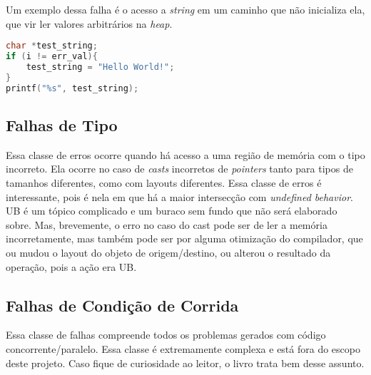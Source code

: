 Um exemplo dessa falha é o acesso a \emph{string} em um caminho que não inicializa ela, que vir ler valores arbitrários na \emph{heap}.

\begin{lstlisting}[language=C, label={lst:initialization}, caption=Exemplo de uma Falha de Inicalização com Strings]
char *test_string;
if (i != err_val){
	test_string = "Hello World!";
}
printf("%s", test_string);
\end{lstlisting}


\subsection{Falhas de Tipo}

Essa classe de erros ocorre quando há acesso a uma região de memória com o tipo incorreto. Ela ocorre no caso de \emph{casts} incorretos de \emph{pointers} tanto para tipos de tamanhos diferentes, como com layouts diferentes. Essa classe de erros é interessante, pois é nela em que há a maior intersecção com \emph{undefined behavior}. UB é um tópico complicado e um buraco sem fundo que não será elaborado sobre. Mas, brevemente, o erro no caso do cast pode ser de ler a memória incorretamente, mas também pode ser por alguma otimização do compilador, que ou mudou o layout do objeto de origem/destino, ou alterou o resultado da operação, pois a ação era UB.

\subsection{Falhas de Condição de Corrida}

Essa classe de falhas compreende todos os problemas gerados com código concorrente/paralelo. Essa classe é extremamente complexa e está fora do escopo deste projeto. Caso fique de curiosidade ao leitor, o livro  trata bem desse assunto. 
